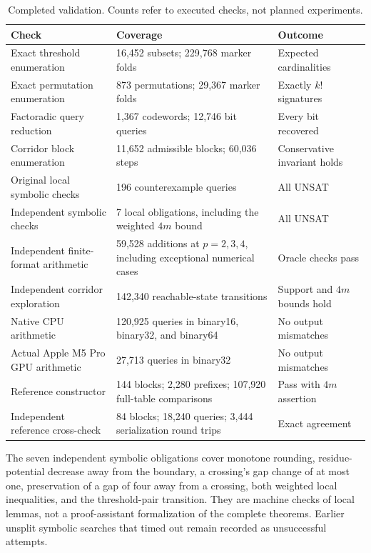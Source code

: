 \documentclass[11pt,reqno]{amsart}
\theoremstyle{definition}
\theoremstyle{remark}
\numberwithin{equation}{section}
\begin{document}
\begin{table}[tbp]
\small
\renewcommand{\arraystretch}{1.13}
\caption{Completed validation. Counts refer to executed checks, not planned experiments.}
\label{tab:validation}
\begin{tabularx}{\textwidth}{@{}P{.26\textwidth}P{.45\textwidth}Y@{}}
\toprule
Check & Coverage & Outcome \\
\midrule
Exact threshold enumeration & 16,452 subsets; 229,768 marker folds & Expected cardinalities \\
Exact permutation enumeration & 873 permutations; 29,367 marker folds & Exactly $k!$ signatures \\
Factoradic query reduction & 1,367 codewords; 12,746 bit queries & Every bit recovered \\
Corridor block enumeration & 11,652 admissible blocks; 60,036 steps & Conservative invariant holds \\
Original local symbolic checks & 196 counterexample queries & All UNSAT \\
Independent symbolic checks & 7 local obligations, including the weighted $4m$ bound & All UNSAT \\
Independent finite-format arithmetic & 59,528 additions at $p=2,3,4$, including exceptional numerical cases & Oracle checks pass \\
Independent corridor exploration & 142,340 reachable-state transitions & Support and $4m$ bounds hold \\
Native CPU arithmetic & 120,925 queries in binary16, binary32, and binary64 & No output mismatches \\
Actual Apple M5 Pro GPU arithmetic & 27,713 queries in binary32 & No output mismatches \\
Reference constructor & 144 blocks; 2,280 prefixes; 107,920 full-table comparisons & Pass with $4m$ assertion \\
Independent reference cross-check & 84 blocks; 18,240 queries; 3,444 serialization round trips & Exact agreement \\
\bottomrule
\end{tabularx}
\end{table}

The seven independent symbolic obligations cover monotone rounding,
residue-potential decrease away from the boundary, a crossing's gap change of
at most one, preservation of a gap of four away from a crossing, both weighted
local inequalities, and the threshold-pair transition. They are machine
checks of local lemmas, not a proof-assistant formalization of the complete
theorems. Earlier unsplit symbolic searches that timed out remain recorded as
unsuccessful attempts.
\end{document}
